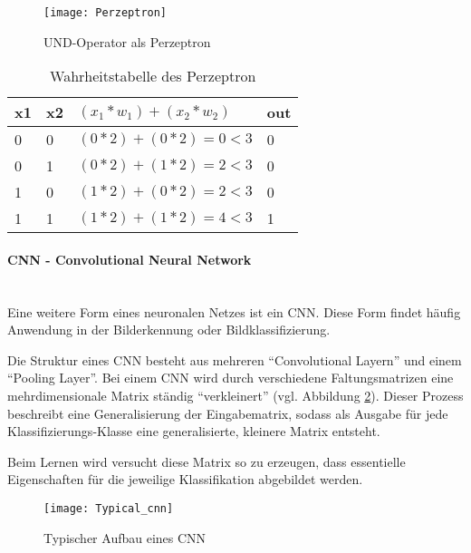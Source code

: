    \begin{figure}[H]
        \centering
        \texttt{[image: Perzeptron]}
        \caption{UND-Operator als Perzeptron \cite{DrawIO}}
        \label{fig:PerzeptronAND}
    \end{figure}

    \begin{table}[H]
        \centering
        \begin{tabular}{|l|l|l|l|}
            \hline
            x1 & x2 & \( (x_1 * w_1) + (x_2 * w_2) \) & out \\
            \hline
            0 & 0 & \( (0 * 2) + (0 * 2) = 0 < 3 \) & 0 \\
            \hline
            0 & 1 & \( (0 * 2) + (1 * 2) = 2 < 3 \) & 0 \\
            \hline
            1 & 0 & \( (1 * 2) + (0 * 2) = 2 < 3 \) & 0 \\
            \hline
            1 & 1 & \( (1 * 2) + (1 * 2) = 4 < 3 \) & 1 \\
            \hline
        \end{tabular}
        \caption{Wahrheitstabelle des Perzeptron}
        \label{tabl:Perzeptron}
    \end{table}

    \paragraph{CNN - Convolutional Neural Network}
    \cite[Vgl. im Folgenden]{Robotics2}\\
    Eine weitere Form eines neuronalen Netzes ist ein \ac{CNN}.
    Diese Form findet häufig Anwendung in der Bilderkennung oder Bildklassifizierung.
    \newline

    Die Struktur eines \ac{CNN} besteht aus mehreren "`Convolutional Layern"' und einem "`Pooling Layer"'.
    Bei einem \ac{CNN} wird durch verschiedene Faltungsmatrizen eine mehrdimensionale Matrix ständig "`verkleinert"' (vgl. Abbildung \ref{fig:Typisch_CNN}).
    Dieser Prozess beschreibt eine Generalisierung der Eingabematrix, sodass als Ausgabe für jede Klassifizierungs-Klasse eine generalisierte, kleinere Matrix entsteht.
    
    Beim Lernen wird versucht diese Matrix so zu erzeugen, dass essentielle Eigenschaften für die jeweilige Klassifikation abgebildet werden.

    \begin{figure}[H]
        \centering
        \texttt{[image: Typical\_cnn]}
        \caption[Typischer Aufbau eines CNN]{Typischer Aufbau eines \ac{CNN} \footnotemark }
        \label{fig:Typisch_CNN}
    \end{figure}



